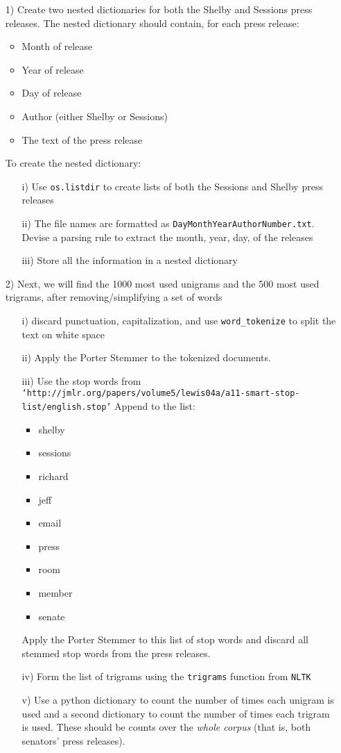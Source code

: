 \documentclass[12pt,letterpaper]{article}
\begin{document}
\begin{itemize}
\item[1)] Create two nested dictionaries for both the Shelby and Sessions press releases.  The nested dictionary should contain, for each press release:
\begin{itemize}
\item Month of release
\item Year of release
\item Day of release
\item Author (either Shelby or Sessions)
\item The text of the press release
\end{itemize}
To create the nested dictionary:
\begin{itemize}
\item[i)] Use {\tt os.listdir} to create lists of both the Sessions and Shelby press releases
\item[ii)] The file names are formatted as {\tt DayMonthYearAuthorNumber.txt}.  Devise a parsing rule to extract the month, year, day, of the releases
\item[iii)] Store all the information in a nested dictionary
\end{itemize}

\item[2)] Next, we will find the 1000 most used unigrams and the 500 most used trigrams, after removing/simplifying a set of words
\begin{itemize}
\item[i)] discard punctuation, capitalization, and use {\tt word\_tokenize} to split the text on white space
\item[ii)] Apply the Porter Stemmer to the tokenized documents.  
\item[iii)] Use the stop words from \\
{\tt `http://jmlr.org/papers/volume5/lewis04a/a11-smart-stop-list/english.stop'}
Append to the list:
\begin{itemize}
\item shelby
\item sessions
\item richard
\item jeff
\item email
\item press 
\item room
\item member 
\item senate
\end{itemize}
Apply the Porter Stemmer to this list of stop words and discard all stemmed stop words from the press releases. 
\item[iv)] Form the list of trigrams using the {\tt trigrams} function from {\tt NLTK}
\item[v)] Use a python dictionary to count the number of times each unigram is used and a second dictionary to count the number of times each trigram is used. These should be counts over the \textit{whole corpus} (that is, both senators' press releases).
\end{itemize}


\end{itemize}
\end{document}
